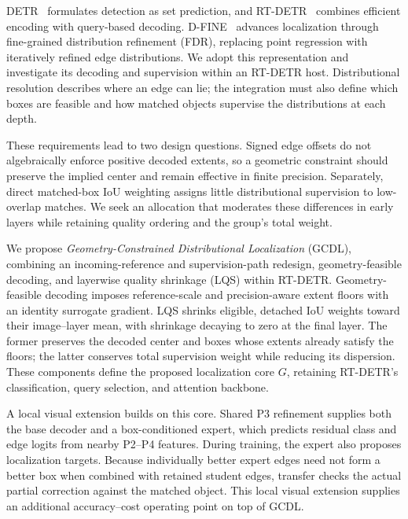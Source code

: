 
DETR~\cite{carion2020detr} formulates detection as set prediction, and RT-DETR~\cite{zhao2024rtdetr} combines efficient encoding with query-based decoding. D-FINE~\cite{peng2025dfine} advances localization through fine-grained distribution refinement (FDR), replacing point regression with iteratively refined edge distributions. We adopt this representation and investigate its decoding and supervision within an RT-DETR host. Distributional resolution describes where an edge can lie; the integration must also define which boxes are feasible and how matched objects supervise the distributions at each depth.

These requirements lead to two design questions. Signed edge offsets do not algebraically enforce positive decoded extents, so a geometric constraint should preserve the implied center and remain effective in finite precision. Separately, direct matched-box IoU weighting assigns little distributional supervision to low-overlap matches. We seek an allocation that moderates these differences in early layers while retaining quality ordering and the group's total weight.

We propose \emph{Geometry-Constrained Distributional Localization} (GCDL), combining an incoming-reference and supervision-path redesign, geometry-feasible decoding, and layerwise quality shrinkage (LQS) within RT-DETR. Geometry-feasible decoding imposes reference-scale and precision-aware extent floors with an identity surrogate gradient. LQS shrinks eligible, detached IoU weights toward their image--layer mean, with shrinkage decaying to zero at the final layer. The former preserves the decoded center and boxes whose extents already satisfy the floors; the latter conserves total supervision weight while reducing its dispersion. These components define the proposed localization core $G$, retaining RT-DETR's classification, query selection, and attention backbone.

A local visual extension builds on this core. Shared P3 refinement supplies both the base decoder and a box-conditioned expert, which predicts residual class and edge logits from nearby P2--P4 features. During training, the expert also proposes localization targets. Because individually better expert edges need not form a better box when combined with retained student edges, transfer checks the actual partial correction against the matched object. This local visual extension supplies an additional accuracy--cost operating point on top of GCDL.

